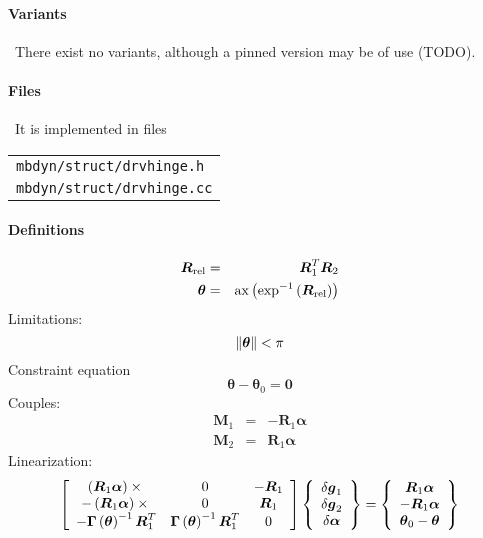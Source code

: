 \documentclass[10pt,dvips,fleqn]{report}
\newcommand{\T}[1]{\boldsymbol{#1}}
\begin{document}
\paragraph{Variants} \
There exist no variants, although a pinned version may be of use (TODO).

\paragraph{Files} \
It is implemented in files

\begin{tabular}{l}
\texttt{mbdyn/struct/drvhinge.h} \\
\texttt{mbdyn/struct/drvhinge.cc}
\end{tabular}

\paragraph{Definitions}
\begin{eqnarray*}
	\T{R}_{\text{rel}} & = & \T{R}_1^T \T{R}_2 \\
	\T{\theta} & = & \llk{ax}\plbr{\llk{exp}^{-1}\plbr{\T{R}_{\text{rel}}}}
\end{eqnarray*}
Limitations:
\begin{equation}
	\nrbr{\T{\theta}} < \pi
\end{equation}
Constraint equation 
\begin{equation}
	\T{\theta} - \T{\theta}_0 = \T{0}
\end{equation}
Couples:
\begin{eqnarray*}
	\T{M}_1 & = & -\T{R}_1 \T{\alpha} \\
	\T{M}_2 & = & \T{R}_1 \T{\alpha}
\end{eqnarray*}
Linearization:
\begin{equation}
	\sqbr{\matr{ccc}{
		\plbr{\T{R}_1 \T{\alpha}}\times{} & 0 & -\T{R}_1 \\
		-\plbr{\T{R}_1 \T{\alpha}}\times{} & 0 & \T{R}_1 \\
		-\T{\Gamma}\plbr{\T{\theta}}^{-1} \T{R}_1^T &
			\T{\Gamma}\plbr{\T{\theta}}^{-1} \T{R}_1^T & 0
	}}\cubr{\cvvect{
		\delta\T{g}_1 \\
		\delta\T{g}_2 \\
		\delta\T{\alpha} \\
	}} = \cubr{\cvvect{
		\T{R}_1 \T{\alpha} \\
		-\T{R}_1 \T{\alpha} \\
		\T{\theta}_0 - \T{\theta}
	}}
\end{equation}
\end{document}

